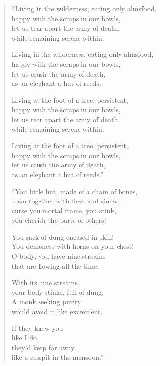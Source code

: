 \documentclass[12pt,openany]{book}%
\begin{document}
\begin{verse}%
“Living in the wilderness, eating only almsfood, \\
happy with the scraps in our bowls, \\
let us tear apart the army of death, \\
while remaining serene within. 

Living in the wilderness, eating only almsfood, \\
happy with the scraps in our bowls, \\
let us crush the army of death, \\
as an elephant a hut of reeds. 

Living at the foot of a tree, persistent, \\
happy with the scraps in our bowls, \\
let us tear apart the army of death, \\
while remaining serene within. 

Living at the foot of a tree, persistent, \\
happy with the scraps in our bowls, \\
let us crush the army of death, \\
as an elephant a hut of reeds.” 

“You little hut, made of a chain of bones, \\
sewn together with flesh and sinew; \\
curse you mortal frame, you stink, \\
you cherish the parts of others! 

You sack of dung encased in skin! \\
You demoness with horns on your chest! \\
O body, you have nine streams \\
that are flowing all the time. 

With its nine streams, \\
your body stinks, full of dung. \\
A monk seeking purity \\
would avoid it like excrement. 

If they knew you \\
like I do, \\
they’d keep far away, \\
like a cesspit in the monsoon.” 


\end{verse}
\end{document}
